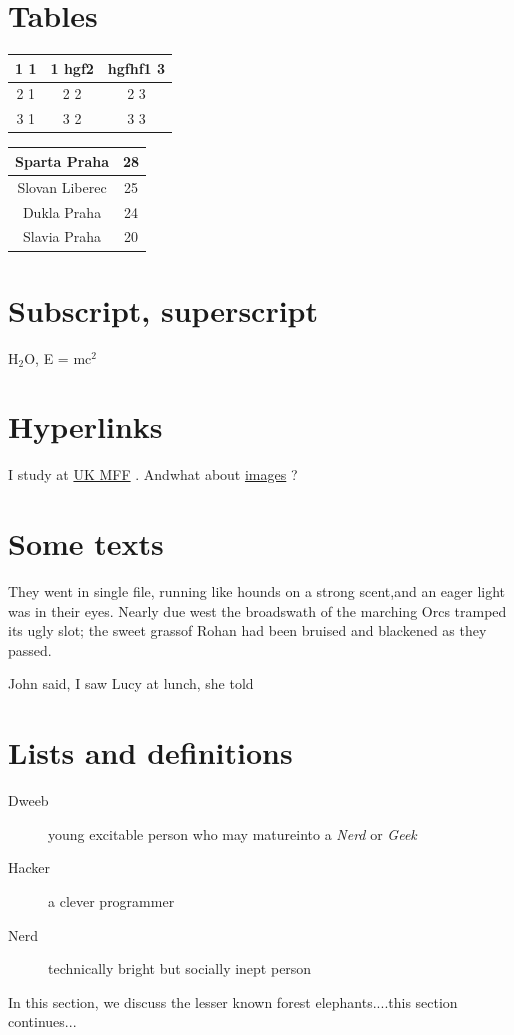 \documentclass{report}
\begin{document}
 \section*{Tables} \begin{table}[!ht]
\begin{tabular}
{ |c|c|c| }
\hline   1 1 & 1 hgf2 & hgfhf1 3\\ 
\hline 2 1 & 2 2 & 2 3\\ 
\hline 3 1 & 3 2 & 3 3\\ 
\hline 
 \end{tabular}
\end{table}

\begin{table}[!ht]
\begin{tabular}
{ |c|c| }
\hline   Sparta Praha & 28\\ 
\hline Slovan Liberec & 25\\ 
\hline Dukla Praha & 24\\ 
\hline Slavia Praha & 20\\ 
\hline 
 \end{tabular}
\end{table}
 \section*{Subscript, superscript} \par H\(_{2}\)O, E = mc\(^{2}\)
 \section*{Hyperlinks} \par I study at \href{http://www.mff.cuni.cz}{UK MFF}
. Andwhat about \href{#img}{images}
?
 \section*{Some texts} \par \begin{center}
They went in single file, running like hounds on a strong scent,and an eager light was in their eyes. Nearly due west the broadswath of the marching \small Orcs tramped\normalsize 
its ugly slot; the sweet grassof Rohan had been bruised and blackened as they passed.\end{center}

\par John said, I saw Lucy at lunch, she told
 \section*{Lists and definitions} \begin{description}
\item[Dweeb]
young excitable person who may matureinto a \emph{Nerd}
or \emph{Geek}
\item[Hacker]
a clever programmer\item[Nerd]
technically bright but socially inept person\end{description}
\par In this section, we discuss the lesser known forest elephants....this section continues...
\end{document}
